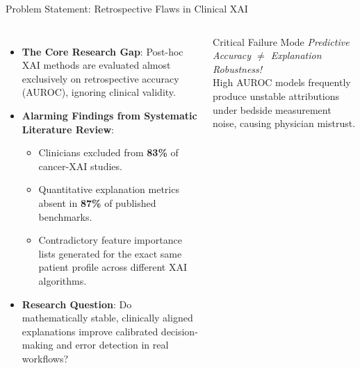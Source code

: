 \documentclass[aspectratio=169,10pt]{beamer}
\begin{document}
\begin{frame}{Problem Statement: Retrospective Flaws in Clinical XAI}
  \begin{columns}
    \begin{itemize}
      \item \textbf{The Core Research Gap}: Post-hoc XAI methods are evaluated almost exclusively on retrospective accuracy (AUROC), ignoring clinical validity.
      \item \textbf{Alarming Findings from Systematic Literature Review}:
      \begin{itemize}
        \item Clinicians excluded from \textbf{83\%} of cancer-XAI studies.
        \item Quantitative explanation metrics absent in \textbf{87\%} of published benchmarks.
        \item Contradictory feature importance lists generated for the exact same patient profile across different XAI algorithms.
      \end{itemize}
      \item \textbf{Research Question}: Do mathematically stable, clinically aligned explanations improve calibrated decision-making and error detection in real workflows?
    \end{itemize}

    \begin{alertblock}{Critical Failure Mode}
      \centering
      \small \textit{Predictive Accuracy $\neq$ Explanation Robustness!} \\
      \vspace{0.2cm}
      High AUROC models frequently produce unstable attributions under bedside measurement noise, causing physician mistrust.
    \end{alertblock}
  \end{columns}
\end{frame}
\end{document}
